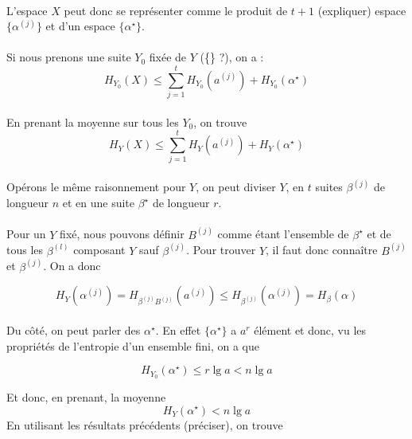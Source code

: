 	\paragraph{}
	L'espace ${X}$ peut donc se représenter comme le produit de $t+1$ 
	(expliquer) espace $\{\alpha^{(j)}\}$ et d'un espace 
	$\{\alpha^\star\}$.
	
	\paragraph{}
	Si nous prenons une suite $Y_0$ fixée de $Y$ (\{\} ?), on a :
	\[
		H_{Y_0}(X)\le 
		\sum_{j=1}^tH_{Y_0}\left(a^{(j)}\right)+H_{Y_0}(\alpha^\star)
	\]
	
	\paragraph{}
	En prenant la moyenne sur tous les $Y_0$, on trouve
	\[H_Y(X)\le \sum_{j=1}^tH_Y\left(a^{(j)}\right)+H_Y(\alpha^\star)\]
	
	\paragraph{}
	Opérons le même raisonnement pour $Y$, on peut diviser $Y$, en $t$ 
	suites $\beta^{(j)}$ de longueur $n$ et en une suite ${\beta^\star}$
	de longueur $r$. 
	
	\paragraph{}
	Pour un $Y$ fixé, nous pouvons définir $B^{(j)}$ comme étant l'ensemble de
	$\beta^\star$ et de tous les $\beta^{(l)}$ composant $Y$ sauf 
	$\beta^{(j)}$. Pour trouver $Y$, il faut donc connaître $B^{(j)}$ 
	et $\beta^{(j)}$. On a 	donc
	
	\[
		H_Y(\alpha^{(j)}) = H_{\beta^{(j)}B^{(j)}}\left(a^{(j)}\right) \le 
		H_{\beta^{(j)}}\left(\alpha^{(j)}\right)=H_\beta(\alpha)
	\]
	
	\paragraph{}
	Du côté, on peut parler des $\alpha^\star$. En effet $\{\alpha^\star\}$ a 
	$a^r$ élément et donc, vu les propriétés de l'entropie d'un ensemble fini,
	on a que
	
	\[H_{Y_0}(\alpha^\star) \le r\lg a < n\lg a\]
	
	Et donc, en prenant, la moyenne 
	\[H_Y(\alpha^\star) < n \lg a\]
	En utilisant les résultats précédents (préciser), on trouve
	
